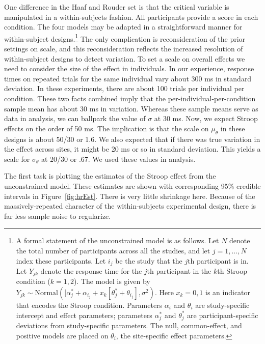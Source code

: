 \documentclass[english,man]{apa6}
\theoremstyle{definition}
\theoremstyle{definition}
\theoremstyle{remark}
\begin{document}
One difference in the Haaf and Rouder set is that the critical variable
is manipulated in a within-subjects fashion. All participants provide a
score in each condition. The four models may be adapted in a
straightforward manner for within-subject designs.\footnote{A formal
  statement of the unconstrained model is as follows. Let \(N\) denote
  the total number of participants across all the studies, and let
  \(j=1,\ldots,N\) index these participants. Let \(i_j\) be the study
  that the \(j\)th participant is in. Let \(Y_{jk}\) denote the response
  time for the \(j\)th participant in the \(k\)th Stroop condition
  (\(k=1,2\)). The model is given by
  \(Y_{jk}\sim \mbox{Normal}([\alpha^*_j+\alpha_{i_j}+x_k[\theta^*_j+\theta_{i_j}],\sigma^2)\).
  Here \(x_k=0,1\) is an indicator that encodes the Stroop condition.
  Parameters \(\alpha_i\) and \(\theta_i\) are study-specific intercept
  and effect parameters; parameters \(\alpha^*_j\) and \(\theta^*_j\)
  are participant-specific deviations from study-specific parameters.
  The null, common-effect, and positive models are placed on
  \(\theta_i\), the site-specific effect parameters.} The only
complication is reconsideration of the prior settings on scale, and this
reconsideration reflects the increased resolution of within-subject
designs to detect variation. To set a scale on overall effects we need
to consider the size of the effect in individuals. In our experience,
response times on repeated trials for the same individual vary about 300
ms in standard deviation. In these experiments, there are about 100
trials per individual per condition. These two facts combined imply that
the per-individual-per-condition sample mean has about 30 ms in
variation. Whereas these sample means serve as data in analysis, we can
ballpark the value of \(\sigma\) at 30 ms. Now, we expect Stroop effects
on the order of 50 ms. The implication is that the scale on
\(\mu_\theta\) in these designs is about 50/30 or 1.6. We also expected
that if there was true variation in the effect across sites, it might be
20 ms or so in standard deviation. This yields a scale for
\(\sigma_\theta\) at 20/30 or .67. We used these values in analysis.

The first task is plotting the estimates of the Stroop effect from the
unconstrained model. These estimates are shown with corresponding 95\%
credible intervals in Figure~\ref{fig:hrEst}. There is very little
shrinkage here. Because of the massively-repeated character of the
within-subjects experimental design, there is far less sample noise to
regularize.
\end{document}
